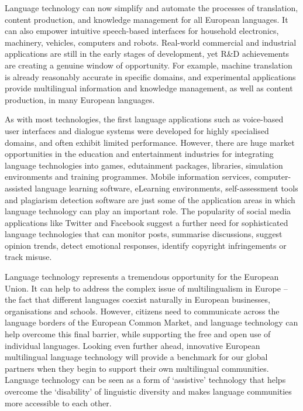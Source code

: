 \documentclass[]{../../metanetpaper}
\begin{document}
\begin{Parallel}[c]{79mm}{78mm}
{Language technology can now simplify and automate the processes of translation, content production, and knowledge management for all European languages. It can also empower intuitive speech-based interfaces for household electronics, machinery, vehicles, computers and robots. Real-world commercial and industrial applications are still in the early stages of development, yet R\&D achievements are creating a genuine window of opportunity. For example, machine translation is already reasonably accurate in specific domains, and experimental applications provide multilingual information and knowledge management, as well as content production, in many European languages. 

As with most technologies, the first language applications such as voice-based user interfaces and dialogue systems were developed for highly specialised domains, and often exhibit limited performance. However, there are huge market opportunities in the education and entertainment industries for integrating language technologies into games, edutainment packages, libraries, simulation environments and training programmes. Mobile information services, computer-assisted language learning software, eLearning environments, self-assessment tools and plagiarism detection software are just some of the application areas in which language technology can play an important role. The popularity of social media applications like Twitter and Facebook suggest a further need for sophisticated language technologies that can monitor posts, summarise discussions, suggest opinion trends, detect emotional responses, identify copyright infringements or track misuse.

Language technology represents a tremendous opportunity for the European Union. It can help to address the complex issue of multilingualism in Europe – the fact that different languages coexist naturally in European businesses, organisations and schools. However, citizens need to communicate across the language borders of the European Common Market, and language technology can help overcome this final barrier, while supporting the free and open use of individual languages. Looking even further ahead, innovative European multilingual language technology will provide a benchmark for our global partners when they begin to support their own multilingual communities. Language technology can be seen as a form of ‘assistive’ technology that helps overcome the ‘disability’ of linguistic diversity and makes language communities more accessible to each other.

}
\end{Parallel}
\end{document}

